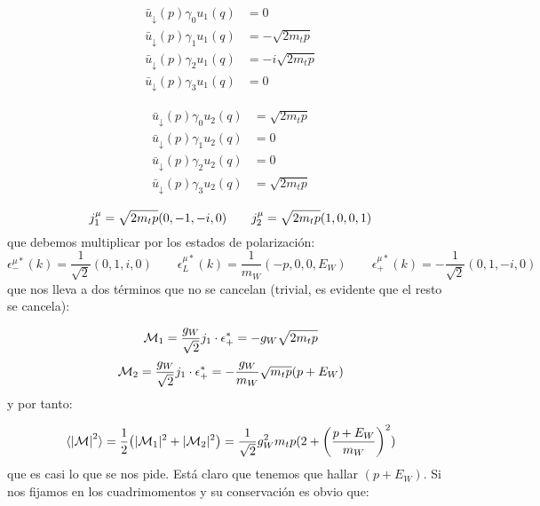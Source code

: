 \begin{minipage}{0.48\linewidth}
\begin{align*}
    \bar{u}_\downarrow (p) \gamma_0 {u}_1 (q) & = 0 \\
    \bar{u}_\downarrow (p) \gamma_1 {u}_1 (q) & = - \sqrt{2m_tp}\\
    \bar{u}_\downarrow (p) \gamma_2 {u}_1 (q) & = - i \sqrt{2m_tp} \\
    \bar{u}_\downarrow (p) \gamma_3 {u}_1 (q) & = 0
\end{align*}
\end{minipage} \hfill
\begin{minipage}{0.48\linewidth}
\begin{align*}
    \bar{u}_\downarrow (p) \gamma_0 {u}_2 (q) & =  \sqrt{2m_tp} \\
    \bar{u}_\downarrow (p) \gamma_1 {u}_2 (q) & = 0 \\
    \bar{u}_\downarrow (p) \gamma_2 {u}_2 (q) & = 0 \\
    \bar{u}_\downarrow (p) \gamma_3 {u}_2 (q) & = \sqrt{2m_tp}
\end{align*}
\end{minipage}
\vspace*{0.5em}
\begin{equation}
	j_1^\mu = \sqrt{2m_tp} \pqty{0,-1,-i,0} \qquad 
	j_2^\mu = \sqrt{2m_tp} \pqty{1,0,0,1}
\end{equation}
que debemos multiplicar por los estados de  polarización: 
\begin{equation*}
	\epsilon_-^{\mu*} (k) = \frac{1}{\sqrt{2}} (0,1,i,0) \qquad \epsilon_L^{\mu*} (k)= \frac{1}{m_W} (-p,0,0,E_W) \qquad \epsilon_+^{\mu*} (k) = - \frac{1}{\sqrt{2}} (0,1,-i,0)
\end{equation*}
que nos lleva a dos términos que no se cancelan (trivial, es evidente que el resto se cancela):

\begin{equation}
	\mathcal{M}_1 = \frac{g_W}{\sqrt{2}} j_1 \cdot \epsilon_+^* = - g_W \sqrt{2m_tp}
\end{equation} 
\begin{equation}
	\mathcal{M}_2 = \frac{g_W}{\sqrt{2}} j_1 \cdot \epsilon_+^* = - \frac{g_W}{m_W}\sqrt{m_tp} (p+E_W)
\end{equation}
y por tanto: 

\begin{equation}
	\langle \vqty{\Mcal}^2 \rangle = \frac{1}{2} \pqty{|\Mcal_1|^2 + |\Mcal_2|^2} = \frac{1}{\sqrt{2}}g_W^2 m_t p (2+\pqty{\frac{p+E_W}{m_W}}^2)
\end{equation}
que es casi lo que se nos pide. Está claro que tenemos que hallar $(p+E_W)$. Si nos fijamos en los cuadrimomentos y su conservación es obvio que:

